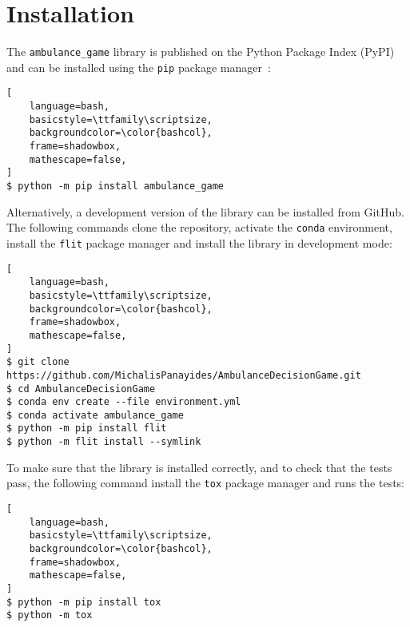 \section{Installation}\label{sec:ambulance_game_installation}

The \texttt{ambulance\_game} library is published on the Python Package
Index (PyPI)
and can be installed using the \texttt{pip} package manager~\cite{pypi}:

\begin{lstlisting}[
    language=bash,
    basicstyle=\ttfamily\scriptsize,
    backgroundcolor=\color{bashcol},
    frame=shadowbox,
    mathescape=false,
]
$ python -m pip install ambulance_game
\end{lstlisting}

Alternatively, a development version of the library can be installed from
GitHub.
The following commands clone the repository, activate the \texttt{conda}
environment, install the \texttt{flit} package manager and install the library
in development mode: 

\begin{lstlisting}[
    language=bash,
    basicstyle=\ttfamily\scriptsize,
    backgroundcolor=\color{bashcol},
    frame=shadowbox,
    mathescape=false,
]
$ git clone https://github.com/MichalisPanayides/AmbulanceDecisionGame.git
$ cd AmbulanceDecisionGame
$ conda env create --file environment.yml
$ conda activate ambulance_game
$ python -m pip install flit
$ python -m flit install --symlink
\end{lstlisting}

To make sure that the library is installed correctly, and to check that the
tests pass, the following command install the \texttt{tox} package manager
and runs the tests:

\begin{lstlisting}[
    language=bash,
    basicstyle=\ttfamily\scriptsize,
    backgroundcolor=\color{bashcol},
    frame=shadowbox,
    mathescape=false,
]
$ python -m pip install tox
$ python -m tox
\end{lstlisting}
